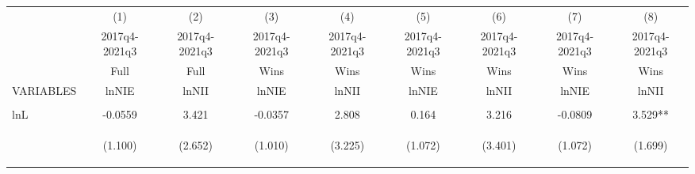 \documentclass[]{article}
\begin{document}
\begin{center}
\begin{tabular}{lcccccccc} \hline
 & (1) & (2) & (3) & (4) & (5) & (6) & (7) & (8) \\
 & 2017q4-2021q3 & 2017q4-2021q3 & 2017q4-2021q3 & 2017q4-2021q3 & 2017q4-2021q3 & 2017q4-2021q3 & 2017q4-2021q3 & 2017q4-2021q3 \\
 & Full & Full & Wins & Wins & Wins & Wins & Wins & Wins \\
VARIABLES & lnNIE & lnNII & lnNIE & lnNII & lnNIE & lnNII & lnNIE & lnNII \\ \hline
\vspace{4pt} & \begin{footnotesize}\end{footnotesize} & \begin{footnotesize}\end{footnotesize} & \begin{footnotesize}\end{footnotesize} & \begin{footnotesize}\end{footnotesize} & \begin{footnotesize}\end{footnotesize} & \begin{footnotesize}\end{footnotesize} & \begin{footnotesize}\end{footnotesize} & \begin{footnotesize}\end{footnotesize} \\
lnL & -0.0559 & 3.421 & -0.0357 & 2.808 & 0.164 & 3.216 & -0.0809 & 3.529** \\
\vspace{4pt} & \begin{footnotesize}(1.100)\end{footnotesize} & \begin{footnotesize}(2.652)\end{footnotesize} & \begin{footnotesize}(1.010)\end{footnotesize} & \begin{footnotesize}(3.225)\end{footnotesize} & \begin{footnotesize}(1.072)\end{footnotesize} & \begin{footnotesize}(3.401)\end{footnotesize} & \begin{footnotesize}(1.072)\end{footnotesize} & \begin{footnotesize}(1.699)\end{footnotesize} \\

\end{tabular}
\end{center}
\end{document}
